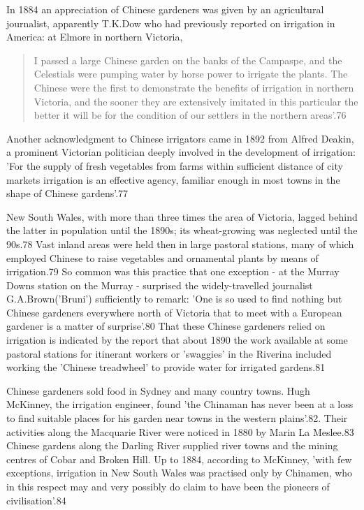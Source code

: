 In 1884 an appreciation of Chinese gardeners was given by an
agricultural journalist, apparently T.K.Dow who had previously
reported on irrigation in America: at Elmore in northern Victoria,
\begin{quote}
	I passed a large Chinese garden on the banks of the Campaspe,
	and the Celestials were pumping water by horse power to
	irrigate the plants. The Chinese were the first to demonstrate
	the benefits of irrigation in northern Victoria, and the
	sooner they are extensively imitated in this particular the
	better it will be for the condition of our settlers in the
	northern areas'.76
\end{quote}

Another acknowledgment to Chinese irrigators came in 1892 from Alfred
Deakin, a prominent Victorian politician deeply involved in the
development of irrigation: 'For the supply of fresh vegetables from
farms within sufficient distance of city markets irrigation is an
effective agency, familiar enough in most towns in the shape of
Chinese gardens'.77

New South Wales, with more than three times the area of Victoria,
lagged behind the latter in population until the 1890s; its
wheat-growing was neglected until the 90s.78 Vast inland areas were
held then in large pastoral stations, many of which employed Chinese
to raise vegetables and ornamental plants by means of irrigation.79 So
common was this practice that one exception - at the Murray Downs
station on the Murray - surprised the widely-travelled journalist
G.A.Brown('Bruni') sufficiently to remark: 'One is so used to find
nothing but Chinese gardeners everywhere north of Victoria that to
meet with a European gardener is a matter of surprise'.80 That these
Chinese gardeners relied on irrigation is indicated by the report that
about 1890 the work available at some pastoral stations for itinerant
workers or 'swaggies' in the Riverina included working the 'Chinese
treadwheel' to provide water for irrigated gardens.81

Chinese gardeners sold food in Sydney and many country towns. Hugh
McKinney, the irrigation engineer, found 'the Chinaman has never been
at a loss to find suitable places for his garden near towns in the
western plains'.82. Their activities along the Macquarie River were
noticed in 1880 by Marin La Meslee.83 Chinese gardens along the
Darling River supplied river towns and the mining centres of Cobar and
Broken Hill. Up to 1884, according to McKinney, 'with few exceptions,
irrigation in New South Wales was practised only by Chinamen, who in
this respect may and very possibly do claim to have been the pioneers
of civilisation'.84

